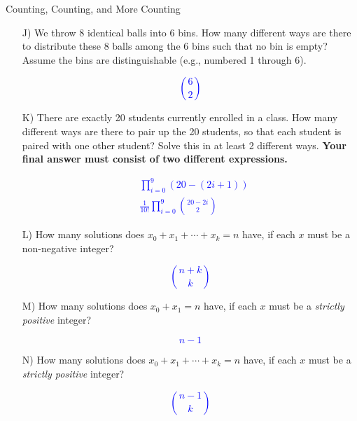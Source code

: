 \begin{homeworkProblem}{Counting, Counting, and More Counting}
\begin{itemize}
\pagebreak

\item[J)] We throw 8 identical balls into 6 bins. How many different 
ways are there to distribute these 8 balls among the 6 bins such that 
no bin is empty? Assume the bins are distinguishable (e.g., numbered 1 
through 6). 

\textcolor{blue}{\[ \binom{6}{2} \]}

\item[K)] There are exactly 20 students currently enrolled in a class. 
How many different ways are there to pair up the 20 students, so that 
each student is paired with one other student? Solve this in at least 2 
different ways. \textbf{Your final answer must consist of two different 
expressions. }

\textcolor{blue}{
    \[
        \begin{split}
            &\prod_{i=0}^{9} (20-(2i+1)) \\
            &\frac{1}{10!} \prod_{i=0}^{9} \binom{20-2i}{2}
        \end{split}    
    \]
}

\item[L)] How many solutions does $x_0 + x_1 + \cdots + x_k = n$ have, 
if each $x$ must be a non-negative integer?

\textcolor{blue}{\[ \binom{n+k}{k} \]}

\item[M)] How many solutions does $x_0 + x_1 = n$ have, if each $x$ must 
be a \emph{strictly positive} integer?

\textcolor{blue}{\[ n-1 \]}

\item[N)] How many solutions does $x_0 + x_1 + \cdots + x_k = n$ have, 
if each $x$ must be a \emph{strictly positive} integer?

\textcolor{blue}{\[ \binom{n-1}{k} \]}

\end{itemize}

\end{homeworkProblem}
